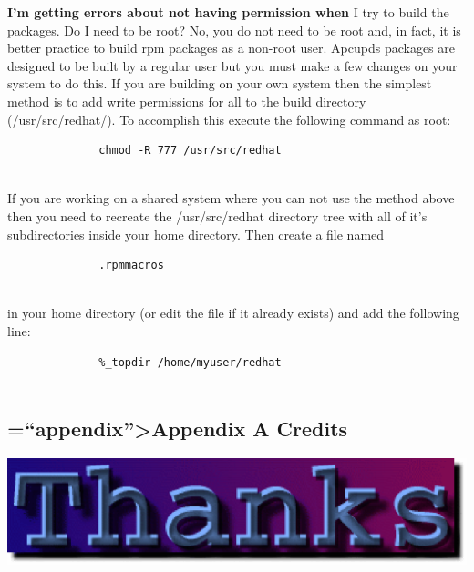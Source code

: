 {{{{{{{{{{{{{{{{{\begin{description}
\item {\bf {\bf I'm getting errors about not having permission when}}
I try to build the packages.  Do I need to be root? No, you do not need to be
root and, in fact, it is better practice to build rpm packages as a non-root
user.  Apcupds packages are designed to be built by a regular user but you
must make a few changes on your system to do this.  If you are building on
your own system then the simplest method is to add write permissions for all
to the build directory (/usr/src/redhat/).  To accomplish this execute the
following command as root:  

\footnotesize
\begin{verbatim}
              chmod -R 777 /usr/src/redhat
     
\end{verbatim}
\normalsize

If you are working on a shared system where you can not use the method above
then you need to recreate the /usr/src/redhat directory tree with all of it's
subdirectories inside your home directory. Then create a file named  

\footnotesize
\begin{verbatim}
              .rpmmacros
     
\end{verbatim}
\normalsize

in your home directory (or edit the file if it already exists) and add the
following line:  

\footnotesize
\begin{verbatim}
              %_topdir /home/myuser/redhat
     
\end{verbatim}
\normalsize

\end{description}

\label{Credits-_003c1_003e}

\subsection*{=``appendix''>Appendix A Credits}

\includegraphics{./thanks.eps}  

}}}}}}}}}}}}}}}}}
